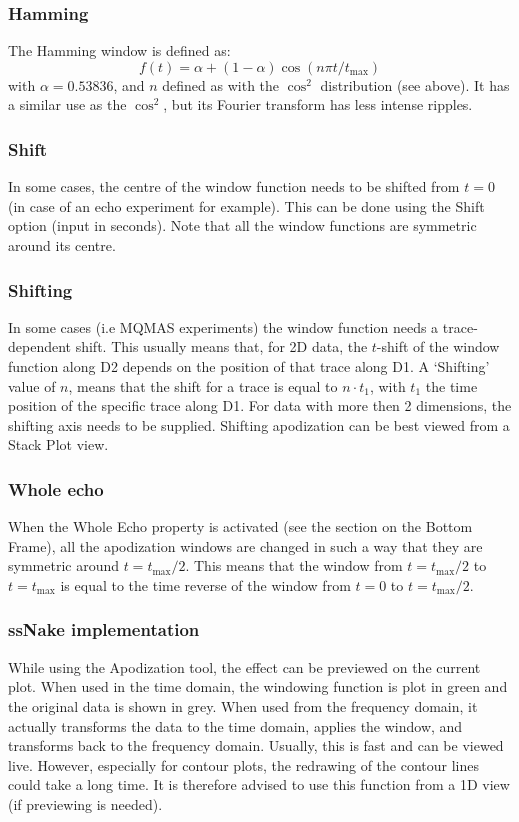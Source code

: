 \documentclass[11pt,a4paper]{article}
\begin{document}
\subsubsection{Hamming}
The Hamming window is defined as:
\begin{equation}
  f(t) = \alpha + (1 - \alpha)\cos(n\pi t/t_\text{max})
\end{equation}
with $\alpha = 0.53836$, and $n$ defined as with the $\cos^2$ distribution (see above). It has a similar use as the $\cos^2$, but its Fourier transform has less intense ripples.

\subsubsection{Shift}
In some cases, the centre of the window function needs to be shifted from $t = 0$ (in case of an echo experiment for example). This can be done using the Shift option (input in seconds). Note that all the window functions are symmetric around its centre.

\subsubsection{Shifting}
In some cases (i.e MQMAS experiments) the window function needs a trace-dependent shift. This usually means that, for 2D data, the $t$-shift of the window function along D2 depends on the position of that trace along D1. A `Shifting' value of $n$, means that the shift for a trace is equal to $n \cdot t_1$, with $t_1$ the time position of the specific trace along D1.
For data with more then 2 dimensions, the shifting axis needs to be supplied.
Shifting apodization can be best viewed from a Stack Plot view.

\subsubsection{Whole echo}
When the Whole Echo property is activated (see the section on the Bottom Frame), all the apodization windows are changed in such a way that they are symmetric around $t = t_\text{max}/2$. This means that the window from $t=t_\text{max}/2$ to $t=t_\text{max}$ is equal to the time reverse of the window from $t=0$ to $t=t_\text{max}/2$.

\subsubsection{ssNake implementation}
While using the Apodization tool, the effect can be previewed on the current plot. When used in the time domain, the windowing function is plot in green and the original data is shown in grey. When used from the frequency domain, it actually transforms the data to the time domain, applies the window, and transforms back to the frequency domain. Usually, this is fast and can be viewed live. However, especially for contour plots, the redrawing of the contour lines could take a long time. It is therefore advised to use this function from a 1D view (if previewing is needed).
\end{document}
